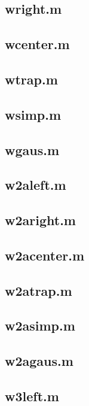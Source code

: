 \documentclass[12pt,a4paper]{article}
\begin{document}
\subsection*{wright.m}

\subsection*{wcenter.m}

\subsection*{wtrap.m}

\subsection*{wsimp.m}

\subsection*{wgaus.m}


\subsection*{w2aleft.m}

\subsection*{w2aright.m}

\subsection*{w2acenter.m}

\subsection*{w2atrap.m}

\subsection*{w2asimp.m}

\subsection*{w2agaus.m}


\subsection*{w3left.m}

\end{document}
